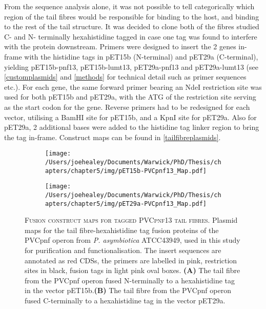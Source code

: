 From the sequence analysis alone, it was not possible to tell categorically which region of the tail fibres would be responsible for binding to the host, and binding to the rest of the tail structure. It was decided to clone both of the fibres studied C- and N- terminally hexahistidine tagged in case one tag was found to interfere with the protein downstream. Primers were designed to insert the 2 genes in-frame with the histidine tags in pET15b (N-terminal) and pET29a (C-terminal), yielding pET15b-pnf13, pET15b-lumt13, pET29a-pnf13 and pET29a-lumt13 (see \vref{customplasmids} and \vref{methods} for technical detail such as primer sequences etc.). For each gene, the same forward primer bearing an NdeI restriction site was used for both pET15b and pET29a, with the ATG of the restriction site serving as the start codon for the gene. Reverse primers had to be redesigned for each vector, utilising a BamHI site for pET15b, and a KpnI site for pET29a. Also for pET29a, 2 additional bases were added to the histidine tag linker region to bring the tag in-frame. Construct maps can be found in \vref{tailfibreplasmids}.


\begin{figure}[p]
\centering
    \begin{subfigure}{\textwidth}
        \centering
        \texttt{[image: /Users/joehealey/Documents/Warwick/PhD/Thesis/chapters/chapter5/img/pET15b-PVCpnf13\_Map.pdf]}
        \captionsetup{singlelinecheck=off, justification=centering, font=footnotesize, aboveskip=10pt}
        \caption{}
        \label{pET15pnf}
    \end{subfigure}%
    
    \begin{subfigure}{\textwidth}
        \centering
            \texttt{[image: /Users/joehealey/Documents/Warwick/PhD/Thesis/chapters/chapter5/img/pET29a-PVCpnf13\_Map.pdf]}
            \captionsetup{singlelinecheck=off, justification=centering, font=footnotesize, aboveskip=10pt}
            \caption{}
            \label{pET29pnf}
        \end{subfigure}%
	\captionsetup{singlelinecheck=off, justification=justified, font=footnotesize, aboveskip=10pt}
	\caption[Plasmid maps for cloned PVCpnf tail fibre proteins]{\textsc{\normalsize Fusion construct maps for tagged PVCpnf13 tail fibres.}\vspace{0.1cm} \newline Plasmid maps for the tail fibre-hexahistidine tag fusion proteins of the PVCpnf operon from \emph{P. asymbiotica} ATCC43949, used in this study for purification and functionalisation. The insert sequences are annotated as red CDSs, the primers are labelled in pink, restriction sites in black, fusion tags in light pink oval boxes. \textbf{(A)} The tail fibre from the PVCpnf operon fused N-terminally to a hexahistidine tag in the vector pET15b.\textbf{(B)} The tail fibre from the PVCpnf operon fused C-terminally to a hexahistidine tag in the vector pET29a.}
	\label{tailfibreplasmids}
\end{figure}


